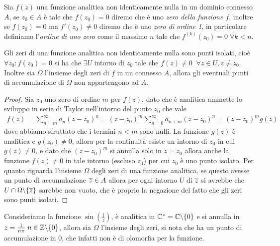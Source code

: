 \begin{definition}
  Sia $ f(z) $ una funzione analitica non identicamente nulla in un dominio connesso $ A $, se $ z_0 \in A $ è tale che $ f(z_0) = 0 $ diremo che è uno 
  \textit{zero della funzione $ f $}, inoltre se $ f(z_0) = 0 $ ma $ f'(z_0) \neq 0 $ diremo che è uno \textit{zero di ordine 1}, in particolare definiamo 
  l'\textit{ordine di uno zero} come il massimo $ n $ tale che $ f^{(k)}(z_0) = 0 \; \forall k < n $.
\end{definition}

\begin{theorem}[  ] \label{thm: gli zeri sono punti isolati}
  Gli zeri di una funzione analitica non identicamente nulla sono punti isolati, cioè $ \forall z_0 : f(z_0) = 0 $ si ha che $ \exists U $ intorno di 
  $ z_0 $ tale che $ f(z) \neq 0 \; \;\forall z \in U, z \neq z_0 $. Inoltre sia $ \Omega $ l'insieme degli zeri di $ f $ in un connesso $ A $, allora 
  gli eventuali punti di accumulazione di $ \Omega $ non appartengono ad $ A $.
\end{theorem}
\begin{proof}
  Sia $ z_0 $ uno zero di ordine $ m $ per $ f(z) $, dato che è analitica ammette lo sviluppo in serie di Taylor nell'intorno del punto $ z_0 $ che vale 
  \begin{align}
    f(z) = \sum_{n = m}^\infty a_n (z - z_0)^n = (z - z_0)^m \sum_{n = 0}^\infty a_{n + m}(z - z_0)^n = (z -z_0)^m g(z)
  \end{align}
  dove abbiamo sfruttato che i termini $ n < m $ sono nulli. La funzione $ g(z) $ è analitica e $ g(z_0) \neq 0 $, allora per la continuità esiste 
  un intorno di $ z_0 $ in cui $ g(z) \neq 0 $, e dato che $ (z - z_0)^m $ si annulla solo in $ z = z_0 $ allora anche la funzione $ f(z) \neq 0 $ 
  in tale intorno (escluso $ z_0 $) per cui $ z_0 $ è uno punto isolato. Per quanto riguarda l'insieme $ \Omega $ degli zeri di una funzione analitica, 
  se questo avesse un punto di accumulazione $ \overline{z} \in A $ allora per ogni intorno $ U $ di $ \overline{z} $ si avrebbe che $ U \cap \Omega \backslash\{\overline{z}\} $ 
  sarebbe non vuoto, che è proprio la negazione del fatto che gli zeri sono punti isolati.
\end{proof}

\begin{example}
  Consideriamo la funzione $ \sin \left( \frac1z \right) $, è analitica in $ \mathbb{C}^* = \mathbb{C} \backslash \{0\} $ e si annulla in 
  $ z = \frac1{n\pi}\; n \in \mathbb{Z} \backslash \{0\} $, allora sia $ \Omega $ l'insieme degli zeri, si nota che ha un punto di accumulazione in $ 0 $, 
  che infatti non è di olomorfia per la funzione.
\end{example}

